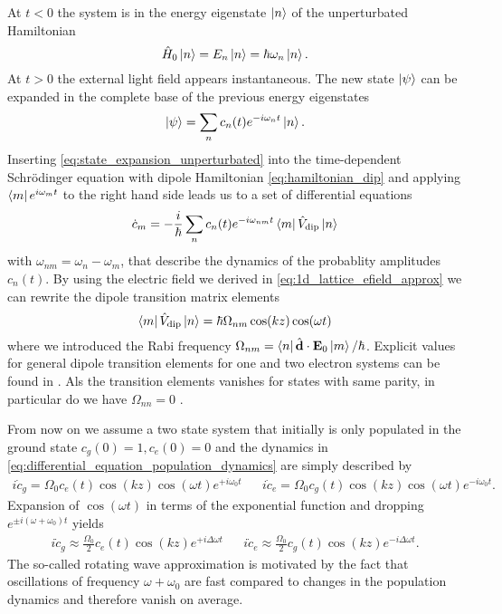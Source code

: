 At $t<0$ the system is in the energy eigenstate $\ket{n}$ of the unperturbated
Hamiltonian
\begin{equation}
  \hat{H}_0\ket{n}
  =E_n\ket{n}
  =\hbar\omega_n\ket{n}
  \label{eq:eigenvalue_energy_unperturbated}.
\end{equation}
At $t>0$ the external light field appears instantaneous. The new state
$\ket{\psi}$ can be expanded in the complete base of the previous energy
eigenstates
\begin{equation}
  \ket{\psi}
  =\sum_nc_n(t)e^{-i\omega_nt}\ket{n}
  \label{eq:state_expansion_unperturbated}.
\end{equation}
Inserting \cref{eq:state_expansion_unperturbated} into the time-dependent
Schrödinger equation with dipole Hamiltonian \cref{eq:hamiltonian_dip} and
applying $\bra{m}e^{i\omega_mt}$ to the right hand side leads us to a set
of differential equations
\begin{equation}
  \dot{c}_m
  =-\frac{i}{\hbar}\sum_nc_n(t)e^{-i\omega_{nm}t}\bra{m}\hat{V}_\text{dip}\ket{n}
  \label{eq:differential_equation_population_dynamics}
\end{equation}
with $\omega_{nm}=\omega_n-\omega_m$, that describe the dynamics of the
probablity amplitudes $c_n(t)$. By using the electric field we derived in
\cref{eq:1d_lattice_efield_approx} we can rewrite the dipole transition
matrix elements
\begin{equation}
  \bra{m}\hat{V}_\text{dip}\ket{n}
  =\hbar\Omega_{nm}\cos(kz)\cos(\omega t)
  \label{eq:elements_dipole_transition_matrix}
\end{equation}
where we introduced the Rabi frequency
$\Omega_{nm}=\bra{n}\hat{\vb{d}}\cdot\vb{E}_0\ket{m}/\hbar$. Explicit values
for general dipole transition elements for one and two electron systems can
be found in \cite{Bethe1957}. Als the transition elements vanishes for states
with same parity, in particular do we have $\Omega_{nn}=0$
\cite{Bartelmann2018}.

From now on we assume a two state system that initially is only populated in
the ground state $c_g(0)=1,c_e(0)=0$ and the dynamics in
\cref{eq:differential_equation_population_dynamics} are simply described by
\begin{align}
  i\dot{c}_g=\Omega_0c_e(t)\cos(kz)\cos(\omega t)e^{+i\omega_0 t} &&
  i\dot{c}_e=\Omega_0c_g(t)\cos(kz)\cos(\omega t)e^{-i\omega_0 t}
  \label{eq:differential_equation_population_dynamics_two_state_system}.
\end{align}
Expansion of $\cos(\omega t)$ in terms of the exponential function and
dropping $e^{\pm i(\omega+\omega_0)t}$ yields
\begin{align}
  i\dot{c}_g\approx\frac{\Omega_0}{2}c_e(t)\cos(kz)e^{+i\Delta\omega t} &&
  i\dot{c}_e\approx\frac{\Omega_0}{2}c_g(t)\cos(kz)e^{-i\Delta\omega t}
  \label{eq:differential_equation_population_dynamics_two_state_system_rwa}.
\end{align}
The so-called rotating wave approximation is motivated by the fact that
oscillations of frequency $\omega+\omega_0$ are fast compared to changes in
the population dynamics and therefore vanish on average.

